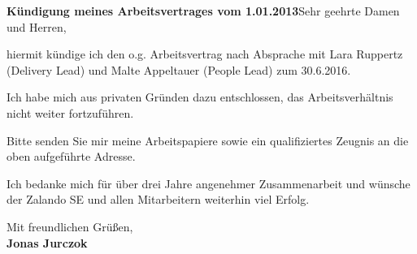 \documentclass[11pt,a4paper,sans]{moderncv} %
\begin{document}


\clearpage

\date{\today} %
\opening{\textbf{Kündigung meines Arbeitsvertrages vom 1.01.2013}\newline{}\newline{}Sehr geehrte Damen und Herren,}
\closing{} 

\makelettertitle

hiermit kündige ich den o.g. Arbeitsvertrag nach Absprache mit Lara Ruppertz (Delivery Lead) und Malte Appeltauer (People Lead) zum 30.6.2016.
 
Ich habe mich aus privaten Gründen dazu entschlossen, das Arbeitsverhältnis nicht weiter fortzuführen.
 
Bitte senden Sie mir meine Arbeitspapiere sowie ein qualifiziertes Zeugnis an die oben aufgeführte Adresse. 

Ich bedanke mich für über drei Jahre angenehmer Zusammenarbeit und wünsche der Zalando SE und allen Mitarbeitern weiterhin viel Erfolg.

Mit freundlichen Grüßen,\\[3.5em]

\bfseries{Jonas Jurczok}


\end{document}
